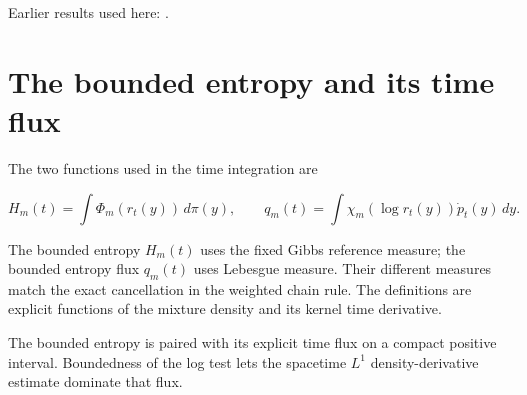 \documentclass[11pt,a4paper]{article}
\begin{document}
Earlier results used here: \cite[Section~3.26.3]{LangevinLean2026ULASC}.

\section{\texorpdfstring{The bounded entropy and its time flux}{The bounded entropy and its time flux}}


The two functions used in the time integration are

\[H_m(t)=\int\Phi_m(r_t(y))\,d\pi(y),\qquad q_m(t)=\int\chi_m(\log r_t(y))\dot p_t(y)\,dy.\]

The bounded entropy \(H_m(t)\) uses the fixed Gibbs reference measure; the bounded entropy flux \(q_m(t)\) uses Lebesgue measure. Their different measures match the exact cancellation in the weighted chain rule. The definitions are explicit functions of the mixture density and its kernel time derivative.



The bounded entropy is paired with its explicit time flux on a compact positive interval. Boundedness of the log test lets the spacetime \(L^1\) density-derivative estimate dominate that flux.
\end{document}
